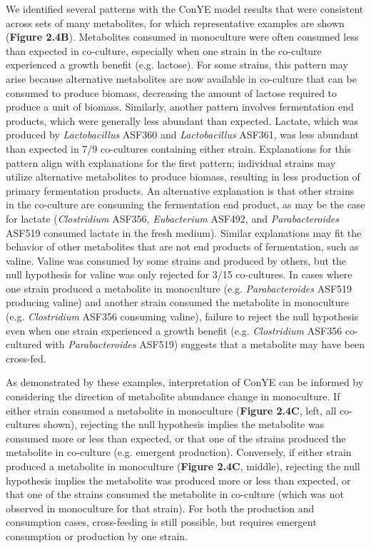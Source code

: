 \documentclass[11pt,twocolumn,notitlepage,openany,twoside]{book}
\begin{document}
\begin{refsection}
We identified several patterns with the ConYE model results that were consistent across sets of many metabolites, for which representative examples are shown (\textbf{Figure 2.4B}). Metabolites consumed in monoculture were often consumed less than expected in co-culture, especially when one strain in the co-culture experienced a growth benefit (e.g. lactose). For some strains, this pattern may arise because alternative metabolites are now available in co-culture that can be consumed to produce biomass, decreasing the amount of lactose required to produce a unit of biomass. Similarly, another pattern involves fermentation end products, which were generally less abundant than expected. Lactate, which was produced by \textit{Lactobacillus} ASF360 and \textit{Lactobacillus} ASF361, was less abundant than expected in 7/9 co-cultures containing either strain. Explanations for this pattern align with explanations for the first pattern; individual strains may utilize alternative metabolites to produce biomass, resulting in less production of primary fermentation products. An alternative explanation is that other strains in the co-culture are consuming the fermentation end product, as may be the case for lactate (\textit{Clostridium} ASF356, \textit{Eubacterium} ASF492, and \textit{Parabacteroides} ASF519 consumed lactate in the fresh medium). Similar explanations may fit the behavior of other metabolites that are not end products of fermentation, such as valine. Valine was consumed by some strains and produced by others, but the null hypothesis for valine was only rejected for 3/15 co-cultures. In cases where one strain produced a metabolite in monoculture (e.g. \textit{Parabacteroides} ASF519 producing valine) and another strain consumed the metabolite in monoculture (e.g. \textit{Clostridium} ASF356 consuming valine), failure to reject the null hypothesis even when one strain experienced a growth benefit (e.g. \textit{Clostridium} ASF356 co-cultured with \textit{Parabacteroides} ASF519) suggests that a metabolite may have been cross-fed.

As demonstrated by these examples, interpretation of ConYE can be informed by considering the direction of metabolite abundance change in monoculture. If either strain consumed a metabolite in monoculture (\textbf{Figure 2.4C}, left, all co-cultures shown), rejecting the null hypothesis implies the metabolite was consumed more or less than expected, or that one of the strains produced the metabolite in co-culture (e.g. emergent production). Conversely, if either strain produced a metabolite in monoculture (\textbf{Figure 2.4C}, middle), rejecting the null hypothesis implies the metabolite was produced more or less than expected, or that one of the strains consumed the metabolite in co-culture (which was not observed in monoculture for that strain). For both the production and consumption cases, cross-feeding is still possible, but requires emergent consumption or production by one strain.


\end{refsection}
\end{document}
